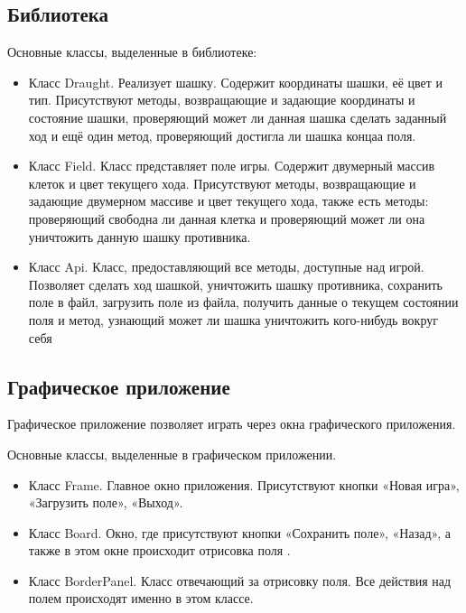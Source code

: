 \documentclass[a4paper]{article}
\begin{document}
\subsection{Библиотека}
\noindent Основные классы, выделенные в библиотеке:
\begin{itemize}
\item Класс Draught. Реализует шашку. Содержит координаты шашки, её цвет и тип. Присутствуют методы, возвращающие и задающие координаты и состояние шашки, проверяющий может ли данная шашка сделать заданный ход и ещё один метод, проверяющий достигла ли шашка концаа поля.
\item Класс Field. Класс представляет поле игры. Содержит двумерный массив клеток и цвет текущего хода. Присутствуют методы, возвращающие и задающие двумерном массиве и цвет текущего хода, также есть методы: проверяющий свободна ли данная клетка и проверяющий  может ли она уничтожить данную шашку противника.	
\item Класс Api. Класс, предоставляющий все методы, доступные над игрой. Позволяет сделать ход шашкой, уничтожить шашку противника, сохранить поле в файл, загрузить поле из файла, получить данные о текущем состоянии поля и метод, узнающий может ли шашка уничтожить кого-нибудь вокруг себя
\end{itemize}

\subsection{Графическое приложение}
Графическое приложение позволяет играть через окна графического приложения.

\noindent Основные классы, выделенные в графическом приложении. 
\begin{itemize}
\item Класс Frame. Главное окно приложения. Присутствуют кнопки «Новая игра», «Загрузить поле», «Выход».
\item Класс Board. Окно, где присутствуют кнопки «Сохранить поле», «Назад», а также в этом окне происходит отрисовка поля .
\item Класс BorderPanel. Класс отвечающий за отрисовку поля. Все действия над полем происходят именно в этом классе.
\end{itemize}
\end{document}
